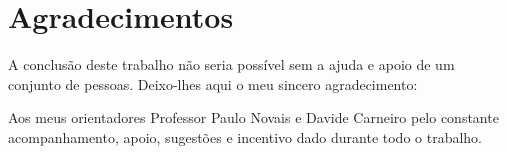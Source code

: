 \documentclass[a4paper, 12pt, oneside]{Thesis}  %
\begin{document}
\frontmatter	  %




\onehalfspacing
\fancyhead{}  %
\rhead{\thepage}  %
\lhead{}  %

\pagestyle{fancy}  %


\clearpage  %

%
%
%



\chapter*{Agradecimentos}

A conclusão deste trabalho não seria possível sem a ajuda e apoio de um conjunto de pessoas. Deixo-lhes aqui o meu sincero agradecimento:


Aos meus orientadores Professor Paulo Novais e Davide Carneiro pelo constante acompanhamento, apoio, sugestões e incentivo dado durante todo o trabalho.
\end{document}
